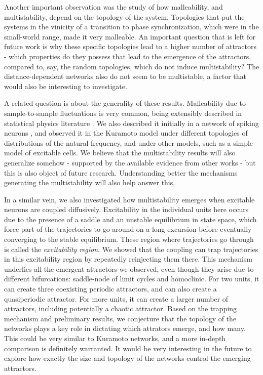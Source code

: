 Another important observation was the study of how malleability, and multistability, depend on the topology of the system. Topologies that put the systems in the vinicity of a transition to phase synchronization, which were in the small-world range, made it very malleable. An important question that is left for future work is why these specific topologies lead to a higher number of attractors - which properties do they possess that lead to the emergence of the attractors, compared to, say, the random topologies, which do not induce multistability? The distance-dependent networks also do not seem to be multistable, a factor that would also be interesting to investigate. 

A related question is about the generality of these results. Malleability due to sample-to-sample fluctuations is very common, being extensibly described in statistical physics literature \cite{sornette2006critical}. We also described it initially in a network of spiking neurons \cite{budzinski2020synchronization}, and observed it in the Kuramoto model under different topologies of distributions of the natural frequency, and under other models, such as a simple model of excitable cells. We believe that the multistability results will also generalize somehow - supported by the available evidence from other works - but this is also object of future research. Understanding better the mechanisms generating the multistability will also help answer this.

In a similar vein, we also investigated how multistability emerges when excitable neurons are coupled diffusively. Excitability in the individual units here occurs due to the presence of a saddle and an unstable equilibrium in state space, which force part of the trajectories to go around on a long excursion before eventually converging to the stable equilibrium. These region where trajectories go through is called the \textit{excitability region}. We showed that the coupling can trap trajectories in this excitability region by repeatedly reinjecting them there. This mechanism underlies all the emergent attractors we observed, even though they arise due to different bifurcations: saddle-node of limit cycles and homoclinic. For two units, it can create three coexisting periodic attractors, and can also create a quasiperiodic attractor. For more units, it can create a larger number of attractors, including potentially a chaotic attractor. Based on the trapping mechanism and preliminary results, we conjecture that the topology of the networks plays a key role in dictating which attrators emerge, and how many. This could be very similar to Kuramoto networks, and a more in-depth comparison is definitely warranted. It would be very interesting in the future to explore how exactly the size and topology of the networks control the emerging attractors. 

